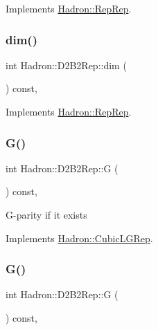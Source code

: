 Implements \mbox{\hyperlink{structHadron_1_1RepRep_a92c8802e5ed7afd7da43ccfd5b7cd92b}{Hadron\+::\+Rep\+Rep}}.

\mbox{\label{structHadron_1_1D2B2Rep_a3b51f6989d504745873697ad4dfde43b}} 
\subsubsection{\texorpdfstring{dim()}{dim()}\hspace{0.1cm}{\footnotesize\ttfamily [3/3]}}
{\footnotesize\ttfamily int Hadron\+::\+D2\+B2\+Rep\+::dim (\begin{DoxyParamCaption}{ }\end{DoxyParamCaption}) const\hspace{0.3cm}{\ttfamily [inline]}, {\ttfamily [virtual]}}



Implements \mbox{\hyperlink{structHadron_1_1RepRep_a92c8802e5ed7afd7da43ccfd5b7cd92b}{Hadron\+::\+Rep\+Rep}}.

\mbox{\label{structHadron_1_1D2B2Rep_a741b356ccf73029f43f20511be4f6ef3}} 
\subsubsection{\texorpdfstring{G()}{G()}\hspace{0.1cm}{\footnotesize\ttfamily [1/2]}}
{\footnotesize\ttfamily int Hadron\+::\+D2\+B2\+Rep\+::G (\begin{DoxyParamCaption}{ }\end{DoxyParamCaption}) const\hspace{0.3cm}{\ttfamily [inline]}, {\ttfamily [virtual]}}

G-\/parity if it exists 

Implements \mbox{\hyperlink{structHadron_1_1CubicLGRep_ace26f7b2d55e3a668a14cb9026da5231}{Hadron\+::\+Cubic\+L\+G\+Rep}}.

\mbox{\label{structHadron_1_1D2B2Rep_a741b356ccf73029f43f20511be4f6ef3}} 
\subsubsection{\texorpdfstring{G()}{G()}\hspace{0.1cm}{\footnotesize\ttfamily [2/2]}}
{\footnotesize\ttfamily int Hadron\+::\+D2\+B2\+Rep\+::G (\begin{DoxyParamCaption}{ }\end{DoxyParamCaption}) const\hspace{0.3cm}{\ttfamily [inline]}, {\ttfamily [virtual]}}

